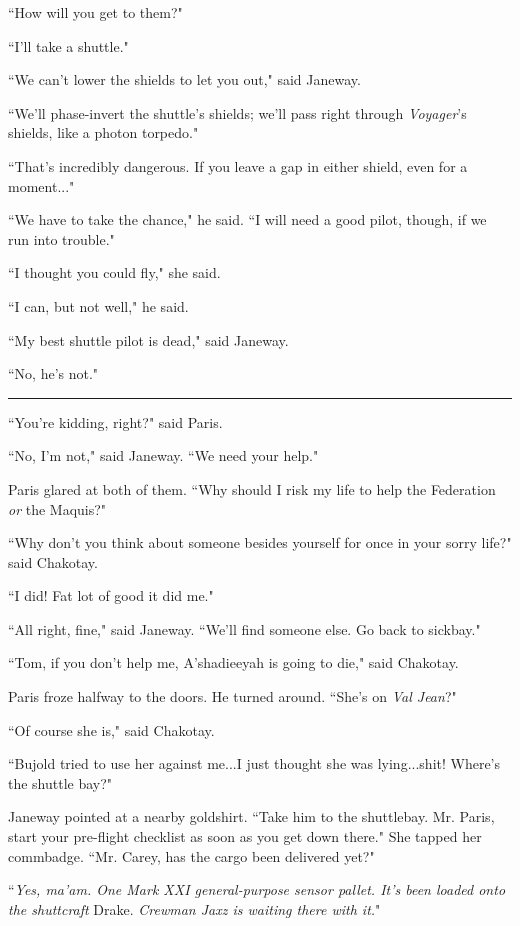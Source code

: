 \documentclass[twoside,letterpaper,12pt]{memoir}
\begin{document}
``How will you get to them?"

``I'll take a shuttle."

``We can't lower the shields to let you out," said Janeway.

``We'll phase-invert the shuttle's shields; we'll pass right through \textit{Voyager}'s shields, like a photon torpedo."

``That's incredibly dangerous. If you leave a gap in either shield, even for a moment..."

“We have to take the chance," he said. ``I will need a good pilot, though, if we run into trouble."

``I thought you could fly," she said.

``I can, but not well," he said.

``My best shuttle pilot is dead," said Janeway.

``No, he's not."

\begin{center}\rule{3cm}{0.4 pt}\end{center}

``You're kidding, right?" said Paris.

``No, I'm not," said Janeway. ``We need your help."

Paris glared at both of them. ``Why should I risk my life to help the Federation \textit{or} the Maquis?"

``Why don't you think about someone besides yourself for once in your sorry life?" said Chakotay.

``I did! Fat lot of good it did me."

``All right, fine," said Janeway. ``We'll find someone else. Go back to sickbay."

``Tom, if you don't help me, A'shadieeyah is going to die," said Chakotay.

Paris froze halfway to the doors. He turned around. ``She's on \textit{Val Jean}?"

``Of course she is," said Chakotay.

``Bujold tried to use her against me...I just thought she was lying...shit! Where's the shuttle bay?"

Janeway pointed at a nearby goldshirt. ``Take him to the shuttlebay. Mr. Paris, start your pre-flight checklist as soon as you get down there." She tapped her commbadge. ``Mr. Carey, has the cargo been delivered yet?"

``\textit{Yes, ma'am. One Mark XXI general-purpose sensor pallet. It's been loaded onto the shuttcraft} Drake. \textit{Crewman Jaxz is waiting there with it.}"
\end{document}
